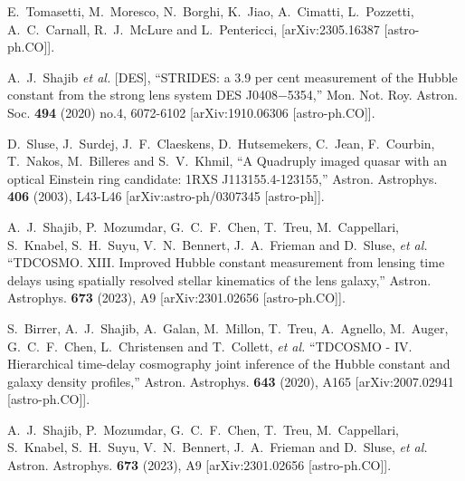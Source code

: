 \documentclass[a4paper,11pt]{article}
\begin{document}
\begin{thebibliography}{99}
E.~Tomasetti, M.~Moresco, N.~Borghi, K.~Jiao, A.~Cimatti, L.~Pozzetti, A.~C.~Carnall, R.~J.~McLure and L.~Pentericci,
[arXiv:2305.16387 [astro-ph.CO]].


A.~J.~Shajib \textit{et al.} [DES],
``STRIDES: a 3.9 per cent measurement of the Hubble constant from the strong lens system DES J0408\ensuremath{-}5354,''
Mon. Not. Roy. Astron. Soc. \textbf{494} (2020) no.4, 6072-6102
[arXiv:1910.06306 [astro-ph.CO]].

D.~Sluse, J.~Surdej, J.~F.~Claeskens, D.~Hutsemekers, C.~Jean, F.~Courbin, T.~Nakos, M.~Billeres and S.~V.~Khmil,
``A Quadruply imaged quasar with an optical Einstein ring candidate: 1RXS J113155.4-123155,''
Astron. Astrophys. \textbf{406} (2003), L43-L46
[arXiv:astro-ph/0307345 [astro-ph]].

A.~J.~Shajib, P.~Mozumdar, G.~C.~F.~Chen, T.~Treu, M.~Cappellari, S.~Knabel, S.~H.~Suyu, V.~N.~Bennert, J.~A.~Frieman and D.~Sluse, \textit{et al.}
``TDCOSMO. XIII. Improved Hubble constant measurement from lensing time delays using spatially resolved stellar kinematics of the lens galaxy,''
Astron. Astrophys. \textbf{673} (2023), A9
[arXiv:2301.02656 [astro-ph.CO]].

S.~Birrer, A.~J.~Shajib, A.~Galan, M.~Millon, T.~Treu, A.~Agnello, M.~Auger, G.~C.~F.~Chen, L.~Christensen and T.~Collett, \textit{et al.}
``TDCOSMO - IV. Hierarchical time-delay cosmography \textendash{} joint inference of the Hubble constant and galaxy density profiles,''
Astron. Astrophys. \textbf{643} (2020), A165
[arXiv:2007.02941 [astro-ph.CO]].

A.~J.~Shajib, P.~Mozumdar, G.~C.~F.~Chen, T.~Treu, M.~Cappellari, S.~Knabel, S.~H.~Suyu, V.~N.~Bennert, J.~A.~Frieman and D.~Sluse, \textit{et al.}
Astron. Astrophys. \textbf{673} (2023), A9
[arXiv:2301.02656 [astro-ph.CO]].


\end{thebibliography}
\end{document}
